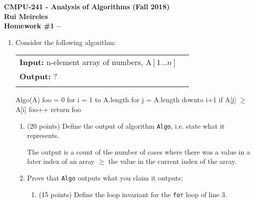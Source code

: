 \documentclass[12pt]{article}
\newenvironment{solution}{}{}
\begin{document}
\begin{center}
{ \Large \bf CMPU-241 - Analysis of Algorithms (Fall 2018)}\\
  {\bf Rui Meireles \\
Homework \#1 -- \\
 }
  \vspace{.15in}

\end{center}




\begin{enumerate}
\item Consider the following algorithm:



\begin{tabular}{l l}

{\bf Input:} n-element array of numbers, A$[1\dots n]$\\
{\bf Output:} ?\\\\

\end{tabular}

\begin{algorithm}[]
Algo(A)
  foo = 0
  for i = 1 to A.length
    for j = A.length downto i+1
      if A[j] $\geq$ A[i]
          foo++
  return foo
\end{algorithm}


\begin{enumerate}
\item (20 points) Define the output of algorithm \texttt{Algo}, i.e. state what it represents.



  \begin{solution}   
  The output is a count of the number of cases where there was a value in a later index of an array $\geq$ the value in the current index of the array.
\end{solution}

\item Prove that \texttt{Algo} outputs what you claim it outputs:

\begin{enumerate}
\item (15 points) Define the loop invariant for the \texttt{for} loop of line 3.



\end{enumerate}
\end{enumerate}
\end{enumerate}
\end{document}
